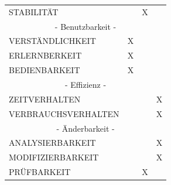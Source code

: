 \documentclass[a4paper]{scrreprt}
\begin{document}
\begin{table}[h!]
\begin{tabular}{llll}
    			STABILITÄT                                   &                                        &  \hspace{6mm}                    X               &                                      \\
    			\multicolumn{4}{c}{- Benutzbarkeit -}\\
    			VERSTÄNDLICHKEIT                             &            \hspace{8mm}         X      &                                   &                                      \\
    			ERLERNBERKEIT                                &            \hspace{8mm}         X      &                                   &                                      \\
    			BEDIENBARKEIT                                &            \hspace{8mm}         X      &                                   &                                      \\
    			\multicolumn{4}{c}{- Effizienz -}\\
    			ZEITVERHALTEN                                &                                        &                                   &      \hspace{6mm}                 X                \\
    			VERBRAUCHSVERHALTEN                          &                                        &                                   &      \hspace{6mm}                 X                \\
    			\multicolumn{4}{c}{- Änderbarkeit -}\\
    			ANALYSIERBARKEIT                             &                                        &                                   &       \hspace{6mm}                X                \\
    			MODIFIZIERBARKEIT                            &                                        &                                   &        \hspace{6mm}               X                \\
    			PRÜFBARKEIT                                  &                                        &     \hspace{6mm}                 X               &                                     \\

\end{tabular}
\end{table}
\end{document}
